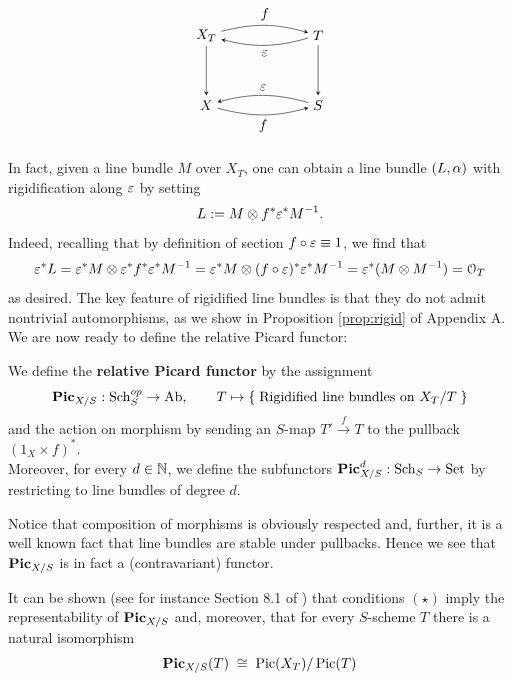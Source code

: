 	\begin{equation*}
	\begin{tikzpicture}[node distance=5em, auto] %
		\node (A) 															{$X_T$};
		\node (B) 	[right of=A, xshift=3em]		{$T$};
	  \node (C) 	[below of=A] 								{$X$};
	  \node (D) 	[right of=C, xshift=3em] 		{$S$};
	  \draw[-stealth, bend left=15, looseness=1]						(A)		to node {$f$} 			(B);
	  \draw[-stealth, bend left=15, looseness=1]						(B)		to node {$\eps$} 	(A);
	  \draw[-stealth]																				(A)		to node {} (C);
	  \draw[-stealth]																				(B)		to node {} (D);
	  \draw[-stealth, bend right=15, looseness=1, swap]			(D)		to node {$\eps$}		(C);
	  \draw[-stealth, bend right=15, looseness=1, swap]			(C)		to node {$f$} 			(D);
	\end{tikzpicture}
	\end{equation*}

	In fact, given a line bundle $M$ over $X_T$, one can obtain a line bundle $(L,\alpha)$ with rigidification along $\varepsilon$ by setting
	$$ L:= M\otimes f^* \varepsilon^* M^{-1} . $$
	Indeed, recalling that by definition of section $f\circ\varepsilon \equiv 1$, we find that
	$$ 
	\varepsilon^* L 
	= 
	\varepsilon^*M\otimes \varepsilon^* f^* \varepsilon^* M^{-1} 
	= 
	\varepsilon^*M\otimes (f\circ\varepsilon)^* \varepsilon^* M^{-1}
	=
	\varepsilon^* (M\otimes M^{-1})
	=
	\mathcal{O}_T  
	$$
	as desired.
	The key feature of rigidified line bundles is that they do not admit nontrivial automorphisms, as we show in Proposition \ref{prop:rigid} of Appendix A.\\

	We are now ready to define the relative Picard functor:
	\begin{defi}
		We define the \textbf{relative Picard functor} by the assignment
		$$ \operatorname{\mathbf{Pic}}_{X/S}:\operatorname{Sch}_S^{{op}} \to \operatorname{Ab}, \qquad T \mapsto \left\{\;  \text{Rigidified line bundles}\text{ on } X_T/T  \; \right\} $$
		and the action on morphism by sending an $S$-map $T'\overset{f}\to T$ to the pullback $(1_X\times f)^*$.\\ 
		Moreover, for every $d\in \mathbb{N}$, we define the subfunctors $\operatorname{\mathbf{Pic}}_{X/S}^d:\operatorname{Sch}_S \to \operatorname{Set}$ by restricting to line bundles of degree $d$.
	\end{defi}
	\begin{rema}
		Notice that composition of morphisms is obviously respected and, further, it is a well known fact that line bundles are stable under pullbacks. Hence we see that $\operatorname{\mathbf{Pic}}_{X/S}$ is in fact a (contravariant) functor.
	\end{rema}	
	It can be shown (see for instance Section 8.1 of \cite{BOSCH}) that conditions $(\star)$ imply the representability of $\operatorname{\mathbf{Pic}}_{X/S}$ and, moreover, that for every $S$-scheme $T$ there is a natural isomorphism
	\begin{equation}\label{eq:PicXS}
		\operatorname{\mathbf{Pic}}_{X/S}(T) \;\cong\; \operatorname{Pic}(X_T) / \operatorname {\operatorname{Pic}}(T)
	\end{equation}

